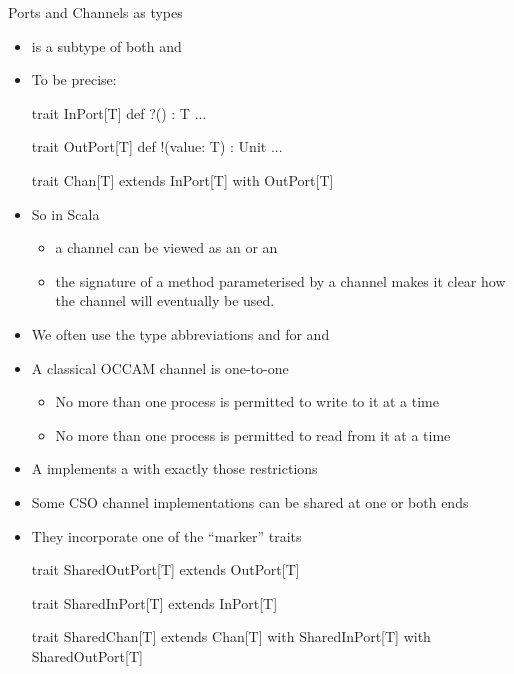 \documentclass{concdistfoils}
\def\heading#1{\begin{cframed}[8.8in]{#1}\end{cframed}}
\begin{document}
\begin{slide}
\heading{Ports and Channels as types}
\vfill
\begin{itemize}

\item {} is a subtype of both  and 

\item To be precise:

\begin{scala}
        trait InPort[T]  { def ?()         : T    ... }
        
        trait OutPort[T] { def !(value: T) : Unit ... }
        
        trait Chan[T] extends InPort[T] with OutPort[T] { }        
\end{scala}
\vfill
\item So in Scala

\begin{itemize}
\item a channel can be viewed as an  or an 

\item the signature of a method parameterised by a channel makes
it clear how the channel will eventually be used.
\end{itemize}
\vfill
\item We often use the type abbreviations  and \SCALA{![T]} for   and 
\end{itemize}
\end{slide}

\begin{slide}
\begin{itemize}
\item A classical OCCAM channel is one-to-one
\begin{itemize}
\item No more than one process is permitted to write to it at a time
\item No more than one process is permitted to read from it at a time
\end{itemize}
\vfill
\item A  implements a  with exactly those restrictions 
\vfill
\item Some CSO channel implementations can be shared at one or both ends
\item They incorporate one of the ``marker'' traits
\begin{scala}

        trait SharedOutPort[T] extends OutPort[T] { }
        
        trait SharedInPort[T]  extends InPort[T]  { }
        
        trait SharedChan[T]    extends Chan[T] with SharedInPort[T] 
                                               with SharedOutPort[T] { }
\end{scala}
\end{itemize}
\end{slide}
\end{document}

